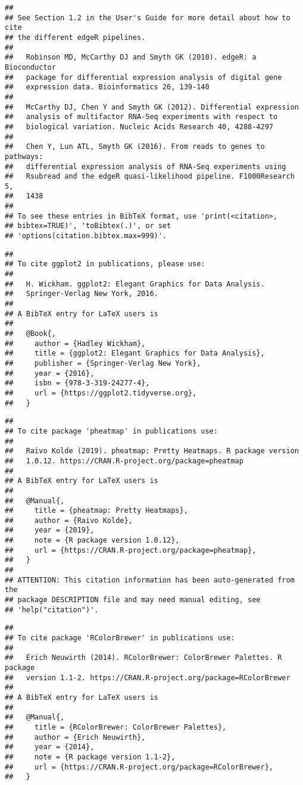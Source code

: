 \documentclass[
]{article}
\begin{document}
\begin{verbatim}
## 
## See Section 1.2 in the User's Guide for more detail about how to cite
## the different edgeR pipelines.
## 
##   Robinson MD, McCarthy DJ and Smyth GK (2010). edgeR: a Bioconductor
##   package for differential expression analysis of digital gene
##   expression data. Bioinformatics 26, 139-140
## 
##   McCarthy DJ, Chen Y and Smyth GK (2012). Differential expression
##   analysis of multifactor RNA-Seq experiments with respect to
##   biological variation. Nucleic Acids Research 40, 4288-4297
## 
##   Chen Y, Lun ATL, Smyth GK (2016). From reads to genes to pathways:
##   differential expression analysis of RNA-Seq experiments using
##   Rsubread and the edgeR quasi-likelihood pipeline. F1000Research 5,
##   1438
## 
## To see these entries in BibTeX format, use 'print(<citation>,
## bibtex=TRUE)', 'toBibtex(.)', or set
## 'options(citation.bibtex.max=999)'.
\end{verbatim}

\begin{verbatim}
## 
## To cite ggplot2 in publications, please use:
## 
##   H. Wickham. ggplot2: Elegant Graphics for Data Analysis.
##   Springer-Verlag New York, 2016.
## 
## A BibTeX entry for LaTeX users is
## 
##   @Book{,
##     author = {Hadley Wickham},
##     title = {ggplot2: Elegant Graphics for Data Analysis},
##     publisher = {Springer-Verlag New York},
##     year = {2016},
##     isbn = {978-3-319-24277-4},
##     url = {https://ggplot2.tidyverse.org},
##   }
\end{verbatim}

\begin{verbatim}
## 
## To cite package 'pheatmap' in publications use:
## 
##   Raivo Kolde (2019). pheatmap: Pretty Heatmaps. R package version
##   1.0.12. https://CRAN.R-project.org/package=pheatmap
## 
## A BibTeX entry for LaTeX users is
## 
##   @Manual{,
##     title = {pheatmap: Pretty Heatmaps},
##     author = {Raivo Kolde},
##     year = {2019},
##     note = {R package version 1.0.12},
##     url = {https://CRAN.R-project.org/package=pheatmap},
##   }
## 
## ATTENTION: This citation information has been auto-generated from the
## package DESCRIPTION file and may need manual editing, see
## 'help("citation")'.
\end{verbatim}

\begin{verbatim}
## 
## To cite package 'RColorBrewer' in publications use:
## 
##   Erich Neuwirth (2014). RColorBrewer: ColorBrewer Palettes. R package
##   version 1.1-2. https://CRAN.R-project.org/package=RColorBrewer
## 
## A BibTeX entry for LaTeX users is
## 
##   @Manual{,
##     title = {RColorBrewer: ColorBrewer Palettes},
##     author = {Erich Neuwirth},
##     year = {2014},
##     note = {R package version 1.1-2},
##     url = {https://CRAN.R-project.org/package=RColorBrewer},
##   }
\end{verbatim}
\end{document}
